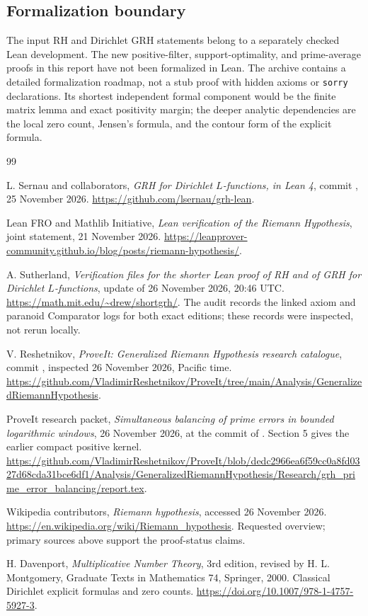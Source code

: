 \documentclass[11pt]{article}
\theoremstyle{remark}\newtheorem{remark}[theorem]{Remark}
\begin{document}
\subsection{Formalization boundary}

The input RH and Dirichlet GRH statements belong to a separately checked
Lean development. The new positive-filter, support-optimality, and
prime-average proofs in this report have not been formalized in Lean.
The archive contains a detailed formalization roadmap, not a stub proof
with hidden axioms or \texttt{sorry} declarations. Its shortest independent
formal component would be the finite matrix lemma and exact positivity
margin; the deeper analytic dependencies are the local zero count,
Jensen's formula, and the contour form of the explicit formula.



\begin{thebibliography}{99}
\raggedright
{}
L. Sernau and collaborators, \emph{GRH for Dirichlet $L$-functions, in
Lean 4}, commit ,
25 November 2026. \url{https://github.com/lsernau/grh-lean}.

Lean FRO and Mathlib Initiative, \emph{Lean verification of the
Riemann Hypothesis}, joint statement, 21 November 2026.
\url{https://leanprover-community.github.io/blog/posts/riemann-hypothesis/}.

A. Sutherland, \emph{Verification files for the shorter Lean proof of
RH and of GRH for Dirichlet $L$-functions}, update of 26 November 2026,
20:46 UTC. \url{https://math.mit.edu/~drew/shortgrh/}.
The audit records the linked axiom and paranoid Comparator logs for
both exact editions; these records were inspected, not rerun locally.

V. Reshetnikov, \emph{ProveIt: Generalized Riemann Hypothesis research
catalogue}, commit ,
inspected 26 November 2026, Pacific time.
\url{https://github.com/VladimirReshetnikov/ProveIt/tree/main/Analysis/GeneralizedRiemannHypothesis}.

ProveIt research packet, \emph{Simultaneous balancing of prime errors
in bounded logarithmic windows}, 26 November 2026, at the commit of
\cite{catalogue}. Section 5 gives the earlier compact positive kernel.
\url{https://github.com/VladimirReshetnikov/ProveIt/blob/dedc2966ea6f59cc0a8fd0327d68cda31bce6df1/Analysis/GeneralizedRiemannHypothesis/Research/grh_prime_error_balancing/report.tex}.

Wikipedia contributors, \emph{Riemann hypothesis}, accessed
26 November 2026. \url{https://en.wikipedia.org/wiki/Riemann_hypothesis}.
Requested overview; primary sources above support the proof-status claims.

H. Davenport, \emph{Multiplicative Number Theory}, 3rd edition,
revised by H. L. Montgomery, Graduate Texts in Mathematics 74,
Springer, 2000. Classical Dirichlet explicit formulas and zero counts.
\url{https://doi.org/10.1007/978-1-4757-5927-3}.


\end{thebibliography}
\end{document}
